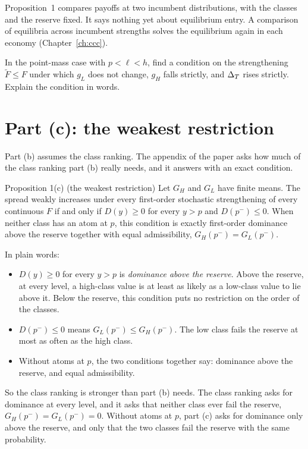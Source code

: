 \begin{watchout}
Proposition~1 compares payoffs at two incumbent distributions, with the classes and the reserve fixed. It says
nothing yet about equilibrium entry. A comparison of equilibria across incumbent strengths solves the equilibrium
again in each economy (Chapter~\ref{ch:ccc}).
\end{watchout}

\begin{checkyourself}
\label{q:auction-strict}
In the point-mass case with \(p<\ell<h\), find a condition on the strengthening \(\tilde F\le F\) under which
\(g_L\) does not change, \(g_H\) falls strictly, and \(\Delta_T\) rises strictly. Explain the condition in words.
\end{checkyourself}

\section{Part (c): the weakest restriction}\label{sec:auction-weakest}

Part (b) assumes the class ranking. The appendix of the paper asks how much of the class ranking part (b) really
needs, and it answers with an exact condition.

\begin{paperresult}{Proposition 1(c) (the weakest restriction)}
Let \(G_H\) and \(G_L\) have finite means. The spread weakly increases under every first-order stochastic
strengthening of every continuous \(F\) if and only if \(D(y)\ge0\) for every \(y>p\) and \(D(p^-)\le0\). When
neither class has an atom at \(p\), this condition is exactly first-order dominance above the reserve together
with equal admissibility, \(G_H(p^-)=G_L(p^-)\).
\end{paperresult}

In plain words:
\begin{itemize}
\item \(D(y)\ge0\) for every \(y>p\) is \emph{dominance above the reserve}. Above the reserve, at every level, a
high-class value is at least as likely as a low-class value to lie above it. Below the reserve, this condition
puts no restriction on the order of the classes.
\item \(D(p^-)\le0\) means \(G_L(p^-)\le G_H(p^-)\). The low class fails the reserve at most as often as the high
class.
\item Without atoms at \(p\), the two conditions together say: dominance above the reserve, and equal
admissibility.
\end{itemize}
So the class ranking is stronger than part (b) needs. The class ranking asks for dominance at every level, and it
asks that neither class ever fail the reserve, \(G_H(p^-)=G_L(p^-)=0\). Without atoms at \(p\), part (c) asks
for dominance only above the reserve, and only that the two classes fail the reserve with the same probability.

